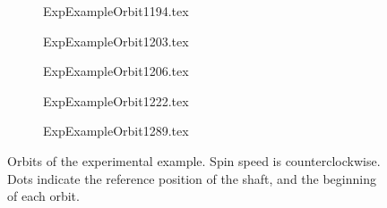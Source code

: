 \begin{figure}
		\def\cs{0.18}
	\def\ss{0.73}
\begin{subfigure}{\cs\textwidth}
	\def\width{\ss\textwidth}
	\centering
	{ExpExampleOrbit1194.tex}
	\label{fig:ExpExampleOrbit1194}
\end{subfigure}
\begin{subfigure}{\cs\textwidth}
	\def\width{\ss\textwidth}
	\centering
	{ExpExampleOrbit1203.tex}
	\label{fig:ExpExampleOrbit1203}
\end{subfigure}\vspace{-2em}
\begin{subfigure}{\cs\textwidth}
	\def\width{\ss\textwidth}
	\centering
	{ExpExampleOrbit1206.tex}
	\label{fig:ExpExampleOrbit1206}
\end{subfigure}
\begin{subfigure}{\cs\textwidth}
	\def\width{\ss\textwidth}
	\centering
	{ExpExampleOrbit1222.tex}
	\label{fig:ExpExampleOrbit1222}
\end{subfigure}
\begin{subfigure}{\cs\textwidth}
	\def\width{\ss\textwidth}
	\centering
	{ExpExampleOrbit1289.tex}
	\label{fig:ExpExampleOrbit1289}
\end{subfigure}
\caption{Orbits of the experimental example. Spin speed is counterclockwise. Dots indicate the reference position of the shaft, and the beginning of each orbit.}
\label{fig:ExpExampleOrbits}
\end{figure}

